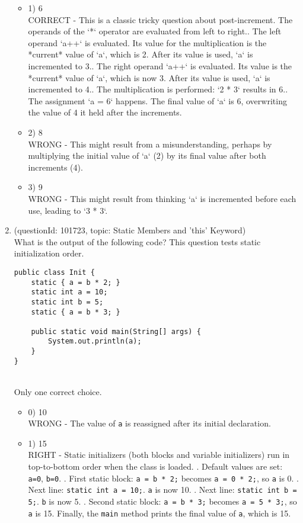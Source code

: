\documentclass[12pt]{article}
\begin{document}
\begin{enumerate}[label=(\arabic*)]
\begin{itemize}
\item 1) 6
 \\ 
CORRECT - This is a classic tricky question about post-increment. The operands of the `*` operator are evaluated from left to right.. The left operand `a++` is evaluated. Its value for the multiplication is the *current* value of `a`, which is 2. After its value is used, `a` is incremented to 3.. The right operand `a++` is evaluated. Its value is the *current* value of `a`, which is now 3. After its value is used, `a` is incremented to 4.. The multiplication is performed: `2 * 3` results in 6.. The assignment `a = 6` happens. The final value of `a` is 6, overwriting the value of 4 it held after the increments.

\item 2) 8
 \\ 
WRONG - This might result from a misunderstanding, perhaps by multiplying the initial value of `a` (2) by its final value after both increments (4).

\item 3) 9
 \\ 
WRONG - This might result from thinking `a` is incremented before each use, leading to `3 * 3`.

\end{itemize}
\item (questionId: 101723, topic: Static Members and 'this' Keyword) \\ 
What is the output of the following code? This question tests static initialization order.\n\begin{verbatim}
public class Init {
    static { a = b * 2; }
    static int a = 10;
    static int b = 5;
    static { a = b * 3; }

    public static void main(String[] args) {
        System.out.println(a);
    }
}
\end{verbatim}
\\ \noindent Only one correct choice. 
\begin{itemize}
\item 0) 10
 \\ 
WRONG - The value of \verb|a| is reassigned after its initial declaration.

\item 1) 15
 \\ 
RIGHT - Static initializers (both blocks and variable initializers) run in top-to-bottom order when the class is loaded. . Default values are set: \verb|a=0|, \verb|b=0|. . First static block: \verb|a = b * 2;| becomes \verb|a = 0 * 2;|, so \verb|a| is 0. . Next line: \verb|static int a = 10;|. \verb|a| is now 10. . Next line: \verb|static int b = 5;|. \verb|b| is now 5. . Second static block: \verb|a = b * 3;| becomes \verb|a = 5 * 3;|, so \verb|a| is 15. \newline Finally, the \verb|main| method prints the final value of \verb|a|, which is 15.


\end{itemize}
\end{enumerate}
\end{document}
